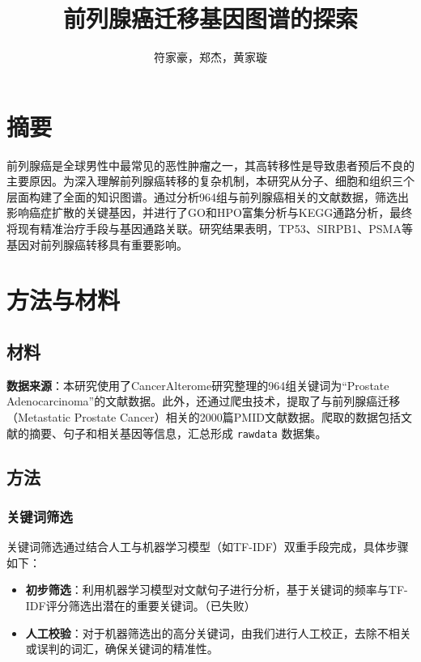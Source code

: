 \documentclass{article}
\title{前列腺癌迁移基因图谱的探索}
\author{符家豪，郑杰，黄家璇}
\date{}
\begin{document}
\maketitle

\section*{摘要}
前列腺癌是全球男性中最常见的恶性肿瘤之一，其高转移性是导致患者预后不良的主要原因。为深入理解前列腺癌转移的复杂机制，本研究从分子、细胞和组织三个层面构建了全面的知识图谱。通过分析964组与前列腺癌相关的文献数据，筛选出影响癌症扩散的关键基因，并进行了GO和HPO富集分析与KEGG通路分析，最终将现有精准治疗手段与基因通路关联。研究结果表明，TP53、SIRPB1、PSMA等基因对前列腺癌转移具有重要影响。

\section*{方法与材料}

\subsection*{材料}

\textbf{数据来源}：本研究使用了CancerAlterome研究整理的964组关键词为“Prostate Adenocarcinoma”的文献数据\href{http://lit-evi.hzau.edu.cn/PanCancer/by-cancer}{}。此外，还通过爬虫技术，提取了与前列腺癌迁移（Metastatic Prostate Cancer）相关的2000篇PMID文献数据。爬取的数据包括文献的摘要、句子和相关基因等信息，汇总形成 \texttt{rawdata} 数据集。

\subsection*{方法}

\subsubsection*{关键词筛选}

关键词筛选通过结合人工与机器学习模型（如TF-IDF）双重手段完成，具体步骤如下：
\begin{itemize}
    \item \textbf{初步筛选}：利用机器学习模型对文献句子进行分析，基于关键词的频率与TF-IDF评分筛选出潜在的重要关键词。（已失败）
    \item \textbf{人工校验}：对于机器筛选出的高分关键词，由我们进行人工校正，去除不相关或误判的词汇，确保关键词的精准性。
\end{itemize}
\end{document}
